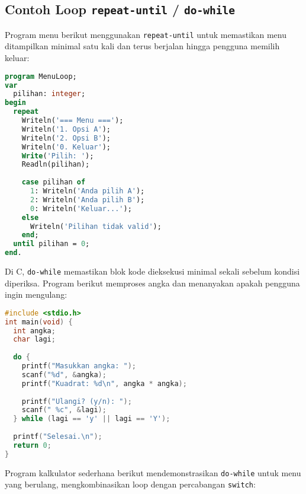 \documentclass[../main.tex]{subfiles}
\begin{document}
\subsection{Contoh Loop \texttt{repeat-until} / \texttt{do-while}}

Program menu berikut menggunakan \texttt{repeat-until} untuk memastikan menu ditampilkan minimal satu kali dan terus berjalan hingga pengguna memilih keluar:

\begin{lstlisting}[language=Pascal, caption={Menu dengan repeat-until (Pascal)}]
program MenuLoop;
var
  pilihan: integer;
begin
  repeat
    Writeln('=== Menu ===');
    Writeln('1. Opsi A');
    Writeln('2. Opsi B');
    Writeln('0. Keluar');
    Write('Pilih: ');
    Readln(pilihan);
    
    case pilihan of
      1: Writeln('Anda pilih A');
      2: Writeln('Anda pilih B');
      0: Writeln('Keluar...');
    else
      Writeln('Pilihan tidak valid');
    end;
  until pilihan = 0;
end.
\end{lstlisting}

Di C, \texttt{do-while} memastikan blok kode dieksekusi minimal sekali sebelum kondisi diperiksa. Program berikut memproses angka dan menanyakan apakah pengguna ingin mengulang:

\begin{lstlisting}[language=C, caption={Input ulang dengan do-while (C)}]
#include <stdio.h>
int main(void) {
  int angka;
  char lagi;
  
  do {
    printf("Masukkan angka: ");
    scanf("%d", &angka);
    printf("Kuadrat: %d\n", angka * angka);
    
    printf("Ulangi? (y/n): ");
    scanf(" %c", &lagi);
  } while (lagi == 'y' || lagi == 'Y');
  
  printf("Selesai.\n");
  return 0;
}
\end{lstlisting}

Program kalkulator sederhana berikut mendemonstrasikan \texttt{do-while} untuk menu yang berulang, mengkombinasikan loop dengan percabangan \texttt{switch}:
\end{document}
